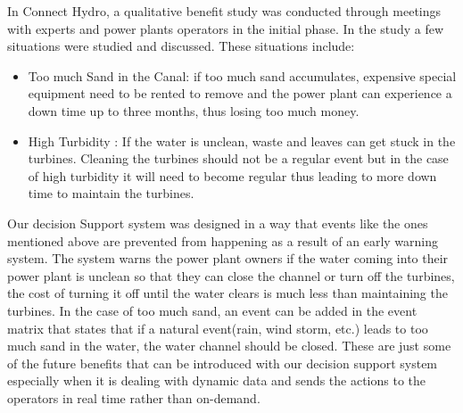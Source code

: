 In Connect Hydro, a qualitative benefit study was conducted through meetings with experts and power plants operators in the initial phase. In the study a few situations were studied and discussed. These situations include:
\begin{itemize}
	\item Too much Sand in the Canal: if too much sand accumulates, expensive special equipment need to be rented to remove and the power plant can experience a down time up to three months, thus losing too much money.
	\item High Turbidity : If the water is unclean, waste and leaves can get stuck in the turbines. Cleaning the turbines should not be a regular event but in the case of high turbidity it will need to become regular thus leading to more down time to maintain the turbines.
\end{itemize}
Our decision Support system was designed in a way that events like the ones mentioned above are prevented from happening as a result of an early warning system. The system warns the power plant owners if the water coming into their power plant is unclean so that they can close the channel or turn off the turbines, the cost of turning it off until the water clears is much less than maintaining the turbines. In the case of too much sand, an event can be added in the event matrix that states that if a natural event(rain, wind storm, etc.) leads to too much sand in the water, the water channel should be closed. These are just some of the future benefits that can be introduced with our decision support system especially when it is dealing with dynamic data and sends the actions to the operators in real time rather than on-demand.